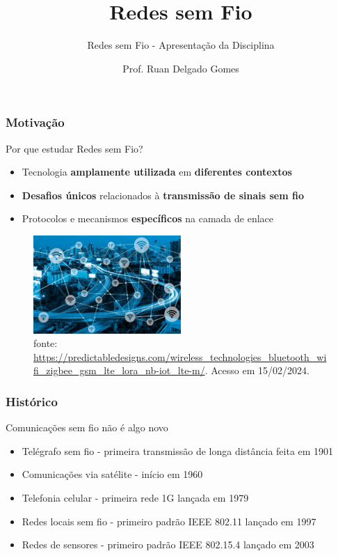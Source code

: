 \documentclass[10pt,xcolor=table]{beamer}
\title{Redes sem Fio}
\subtitle{Redes sem Fio - Apresentação da Disciplina}
\date{}
\author{Prof. Ruan Delgado Gomes}
\institute{UA2 - IFPB}
\begin{document}
\maketitle

\begin{frame}
	\frametitle{Motivação}
    \begin{block}{Por que estudar Redes sem Fio?}
		\begin{itemize}
			\item Tecnologia \textbf{amplamente utilizada} em \textbf{diferentes contextos}
            \vspace{2mm}
            \item \textbf{Desafios únicos} relacionados à \textbf{transmissão de sinais sem fio}
            \vspace{2mm}
            \item Protocolos e mecanismos \textbf{específicos} na camada de enlace
		\end{itemize}
	\end{block}
	\begin{figure}[htbp]
    	\includegraphics[width=0.5\textwidth]{figuras/WirelessNetwork-1.jpg}\\
        \tiny fonte: \url{https://predictabledesigns.com/wireless_technologies_bluetooth_wifi_zigbee_gsm_lte_lora_nb-iot_lte-m/}. Acesso em 15/02/2024.
	\end{figure}
\end{frame}

\begin{frame}
	\frametitle{Histórico}
    \begin{block}{Comunicações sem fio não é algo novo}
		\begin{itemize}
			\item Telégrafo sem fio - primeira transmissão de longa distância feita em 1901
            \vspace{2mm}
            \item Comunicações via satélite - início em 1960
            \vspace{2mm}
            \item Telefonia celular - primeira rede 1G lançada em 1979
            \vspace{2mm}
            \item Redes locais sem fio - primeiro padrão IEEE 802.11 lançado em 1997
            \vspace{2mm}
            \item Redes de sensores - primeiro padrão IEEE 802.15.4 lançado em 2003
		\end{itemize}
	\end{block}
\end{frame}
\end{document}
